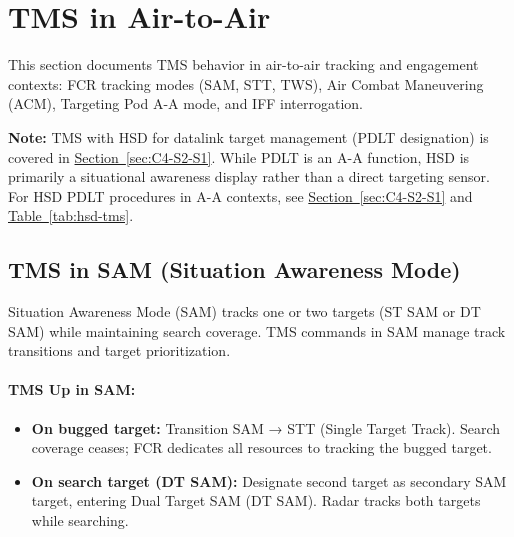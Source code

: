 \documentclass[11pt, a4paper, twoside]{report}
\newcommand{\secref}[1]{\hyperref[#1]{Section~\ref*{#1}}}
\newcommand{\tabref}[1]{\hyperref[#1]{Table~\ref*{#1}}}
\begin{document}
\section{TMS in Air-to-Air}
\label{sec:C4-S3}

This section documents TMS behavior in air-to-air tracking and engagement contexts: FCR tracking modes (SAM, STT, TWS), Air Combat Maneuvering (ACM), Targeting Pod A-A mode, and IFF interrogation.

\textbf{Note:} TMS with HSD for datalink target management (PDLT designation) is covered in \secref{sec:C4-S2-S1}. While PDLT is an A-A function, HSD is primarily a situational awareness display rather than a direct targeting sensor. 
For HSD PDLT procedures in A-A contexts, see \secref{sec:C4-S2-S1} and \tabref{tab:hsd-tms}.

\subsection{TMS in SAM (Situation Awareness Mode)}
\label{sec:C4-S3-S1}

Situation Awareness Mode (SAM) tracks one or two targets (ST SAM or DT SAM) while maintaining search coverage. TMS commands in SAM manage track transitions and target prioritization.

\paragraph{TMS Up in SAM:}
\begin{itemize}
    \item \textbf{On bugged target:} Transition SAM → STT (Single Target Track). Search coverage ceases; FCR dedicates all resources to tracking the bugged target.
    \item \textbf{On search target (DT SAM):} Designate second target as secondary SAM target, entering Dual Target SAM (DT SAM). Radar tracks both targets while searching.
\end{itemize}
\end{document}
